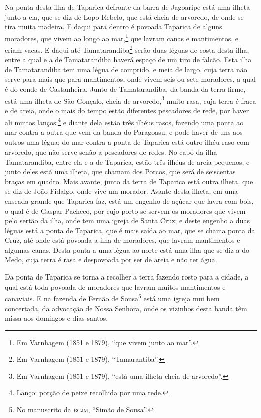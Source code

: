 Na ponta desta ilha de Taparica defronte da barra de Jagoaripe está uma ilheta junto a
ela, que se diz de Lopo Rebelo, que está cheia de arvoredo, de onde se tira muita madeira.
E daqui para dentro é povoada Taparica de alguns moradores, que vivem ao longo ao
mar,\footnote{ Em Varnhagem (1851 e 1879), ``que vivem junto ao mar''.} que lavram canas e
mantimentos, e criam vacas. E daqui até Tamatarandiba\footnote{ Em Varnhagem (1851 e
1879), ``Tamarantiba''.} serão duas léguas de costa desta ilha, entre a qual e a de
Tamatarandiba haverá espaço de um tiro de falcão. Esta ilha de Tamatarandiba tem uma légua
de comprido, e meia de largo, cuja terra não serve para mais que para mantimentos, onde
vivem seis ou sete moradores, a qual é do conde de Castanheira. Junto de Tamatarandiba, da
banda da terra firme, está uma ilheta de São Gonçalo, cheia de arvoredo,\footnote{ Em
Varnhagem (1851 e 1879), ``está uma ilheta cheia de arvoredo''.} muito rasa, cuja terra é
fraca e de areia, onde o mais do tempo estão diferentes pescadores de rede, por haver ali
muitos lanços;\footnote{ Lanço: porção de peixe recolhida por uma rede.} e diante dela
estão três ilhéus rasos, fazendo uma ponta ao mar contra a outra que vem da banda do
Paragoasu, e pode haver de uns aos outros uma légua; do mar contra a ponta de Taparica
está outro ilhéu raso com arvoredo, que não serve senão a pescadores de redes. No cabo da
ilha Tamatarandiba, entre ela e a de Taparica, estão três ilhéus de areia pequenos, e
junto deles está uma ilheta, que chamam dos Porcos, que será de seiscentas braças em
quadro. Mais avante, junto da terra de Taparica está outra ilheta, que se diz de João
Fidalgo, onde vive um morador. Avante desta ilheta, em uma enseada grande que Taparica
faz, está um engenho de açúcar que lavra com bois, o qual é de Gaspar Pacheco, por cujo
porto se servem os moradores que vivem pelo sertão da ilha, onde tem uma igreja de Santa
Cruz; e deste engenho a duas léguas está a ponta de Taparica, que é mais saída ao mar, que
se chama ponta da Cruz, até onde está povoada a ilha de moradores, que lavram mantimentos
e algumas canas. Desta ponta a uma légua ao norte está uma ilha que se diz a do Medo, cuja
terra é rasa e despovoada por ser de areia e não ter água.

Da ponta de Taparica se torna a recolher a terra fazendo rosto para a cidade, a qual está
toda povoada de moradores que lavram muitos mantimentos e canaviais. E na fazenda de
Fernão de Sousa\footnote{ No manuscrito da \textsc{bgjm}, ``Simão de Sousa''.} está uma
igreja mui bem concertada, da advocação de Nossa Senhora, onde os vizinhos desta banda têm
missa aos domingos e dias santos.

